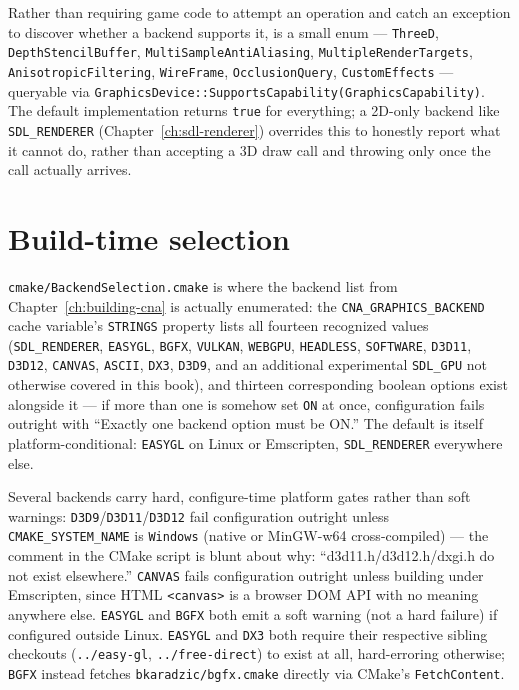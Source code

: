 Rather than requiring game code to attempt an operation and catch an exception to discover
whether a backend supports it,  is a small enum ---
\texttt{ThreeD}, \texttt{DepthStencilBuffer}, \texttt{MultiSampleAntiAliasing},
\texttt{MultipleRenderTargets}, \texttt{AnisotropicFiltering}, \texttt{WireFrame},
\texttt{OcclusionQuery}, \texttt{CustomEffects} --- queryable via
\texttt{GraphicsDevice::SupportsCapability(GraphicsCapability)}. The default implementation
returns \texttt{true} for everything; a 2D-only backend like \texttt{SDL\_RENDERER}
(Chapter~\ref{ch:sdl-renderer}) overrides this to honestly report what it cannot do, rather
than accepting a 3D draw call and throwing only once the call actually arrives.

\section{Build-time selection}

\texttt{cmake/BackendSelection.cmake} is where the backend list from
Chapter~\ref{ch:building-cna} is actually enumerated: the \texttt{CNA\_GRAPHICS\_BACKEND}
cache variable's \texttt{STRINGS} property lists all fourteen recognized values
(\texttt{SDL\_RENDERER}, \texttt{EASYGL}, \texttt{BGFX}, \texttt{VULKAN}, \texttt{WEBGPU},
\texttt{HEADLESS}, \texttt{SOFTWARE}, \texttt{D3D11}, \texttt{D3D12}, \texttt{CANVAS},
\texttt{ASCII}, \texttt{DX3}, \texttt{D3D9}, and an additional experimental
\texttt{SDL\_GPU} not otherwise covered in this book), and thirteen corresponding boolean
options exist alongside it --- if more than one is somehow set \texttt{ON} at once,
configuration fails outright with ``Exactly one backend option must be ON.'' The default is
itself platform-conditional: \texttt{EASYGL} on Linux or Emscripten, \texttt{SDL\_RENDERER}
everywhere else.

Several backends carry hard, configure-time platform gates rather than soft warnings:
\texttt{D3D9}/\texttt{D3D11}/\texttt{D3D12} fail configuration outright unless
\texttt{CMAKE\_SYSTEM\_NAME} is \texttt{Windows} (native or MinGW-w64 cross-compiled) ---
the comment in the CMake script is blunt about why: ``d3d11.h/d3d12.h/dxgi.h do not exist
elsewhere.'' \texttt{CANVAS} fails configuration outright unless building under Emscripten,
since HTML \texttt{<canvas>} is a browser DOM API with no meaning anywhere else.
\texttt{EASYGL} and \texttt{BGFX} both emit a soft warning (not a hard failure) if configured
outside Linux. \texttt{EASYGL} and \texttt{DX3} both require their respective sibling
checkouts (\texttt{../easy-gl}, \texttt{../free-direct}) to exist at all, hard-erroring
otherwise; \texttt{BGFX} instead fetches \texttt{bkaradzic/bgfx.cmake} directly via CMake's
\texttt{FetchContent}.

